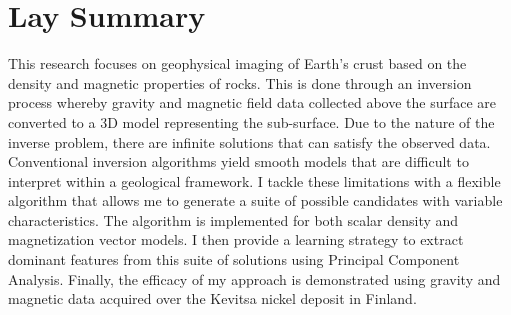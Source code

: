 
\chapter{Lay Summary}
This research focuses on geophysical imaging of Earth's crust based on the density and magnetic properties of rocks. This is done through an inversion process whereby gravity and magnetic field data collected above the surface are converted to a 3D model representing the sub-surface. Due to the nature of the inverse problem, there are infinite solutions that can satisfy the observed data. Conventional inversion algorithms yield smooth models that are difficult to interpret within a geological framework. I tackle these limitations with a flexible algorithm that allows me to generate a suite of possible candidates with variable characteristics. The algorithm is implemented for both scalar density and magnetization vector models. I then provide a learning strategy to extract dominant features from this suite of solutions using Principal Component Analysis. Finally, the efficacy of my approach is demonstrated using gravity and magnetic data acquired over the Kevitsa nickel deposit in Finland.
\endinput
